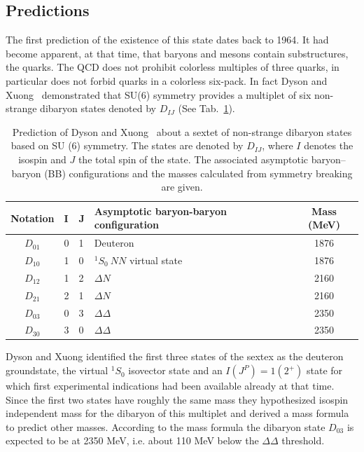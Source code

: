 %
\subsection{Predictions} \label{sec:2.2.1}

The first prediction of the existence of this state dates back to 1964. 
It had become apparent, at that time, that baryons and mesons contain substructures, the quarks.
The QCD does not prohibit colorless multiples of three quarks, in particular does not forbid 
quarks in a colorless six-pack. In fact Dyson and Xuong~\cite{dysonxuong} demonstrated that SU(6)
symmetry provides a multiplet of six non-strange dibaryon states denoted by $D_{IJ}$ 
(See Tab.~\ref{tab:dibaryons}).

\begingroup
\renewcommand{\arraystretch}{1.2} %
\begin{table}
\centering
\begin{tabularx}{\textwidth}{cXXlc}
\toprule
\textbf{Notation}    &   \textbf{I}   &   \textbf{J}   &   \textbf{Asymptotic baryon-baryon configuration}            &\textbf{Mass (MeV)} \\
\midrule
$D_{01}$    &   0   &   1   &   \qquad \qquad Deuteron                            &   1876    \\
$D_{10}$    &   1   &   0   &   \qquad \qquad $^{1}S_{0}\ NN$ virtual state       &   1876    \\ 
$D_{12}$    &   1   &   2   &   \qquad \qquad $\Delta N$                          &   2160    \\
$D_{21}$    &   2   &   1   &   \qquad \qquad $\Delta N$                          &   2160    \\
$D_{03}$    &   0   &   3   &   \qquad \qquad $\Delta \Delta$                     &   2350    \\
$D_{30}$    &   3   &   0   &   \qquad \qquad $\Delta \Delta$                     &   2350    \\
\bottomrule
\end{tabularx}
\caption{Prediction of Dyson and Xuong~\cite{dysonxuong} about a sextet of non-strange dibaryon states based on SU (6) symmetry. The states are denoted by $D_{IJ}$, where $I$ denotes the isospin and $J$ the total spin of the state. The associated asymptotic baryon–baryon (BB) configurations and the masses calculated from symmetry breaking are given.}
\label{tab:dibaryons}
\end{table}
\endgroup

Dyson and Xuong identified the first three states of the sextex as the deuteron groundstate, the virtual
$^{1}S_{0}$ isovector state and an $I(J^{P}) = 1(2^{+})$ state for which first experimental indications
had been available already at that time.
Since the first two states have roughly the same mass they hypothesized isospin independent mass for the 
dibaryon of this multiplet and derived a mass formula to predict other masses.
According to the mass formula the dibaryon state $D_{03}$ is expected to be at 2350 MeV, 
i.e. about 110 MeV below the $\Delta \Delta$ threshold.

